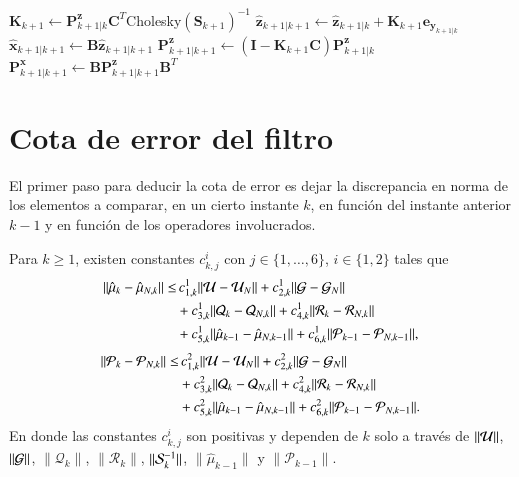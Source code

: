 \begin{algorithm}[h]
\begin{algorithmic}[1]
    \State $\mathbf{K}_{k+1} \gets \mathbf{P}^{\mathbf{z}}_{k+1|k} \mathbf{C}^T$Cholesky$(\mathbf{S}_{k+1})^{-1}$
    \State $\hat{\mathbf{z}}_{k+1|k+1} \gets \hat{\mathbf{z}}_{k+1|k} + \mathbf{K}_{k+1} \mathbf{e}_{\mathbf{y}_{k+1|k}}$
    \State $\hat{\mathbf{x}}_{k+1|k+1} \gets \mathbf{B}\hat{\mathbf{z}}_{k+1|k+1}$
    \State $\mathbf{P}^\mathbf{z}_{k+1|k+1} \gets (\mathbf{I} - \mathbf{K}_{k+1} 
    \mathbf{C}) \mathbf{P}^{\mathbf{z}}_{k+1|k}$
    \State $\mathbf{P}^\mathbf{x}_{k+1|k+1} \gets \mathbf{B}\mathbf{P}^\mathbf{z}_{k+1|k+1} \mathbf{B}^T$
\EndFor
\end{algorithmic}
\end{algorithm}

\section{Cota de error del filtro}

El primer paso para deducir la cota de error es dejar la discrepancia en norma de los elementos a comparar, en un cierto instante $k$, en función del instante anterior $k-1$ y en función de los operadores involucrados.

\begin{prop}
	Para $k \geq 1$, existen constantes $c_{k,j}^i$ con $j \in \{ 1, \dots, 6\}$, $i \in \{ 1, 2\}$ tales que
	\begin{equation*}
		\begin{aligned}
			\| \hat \mu_{k} - \hat \mu_{N,k}  \| \leq & \, c_{1,k}^1 \| \U - \U_N \| +  c_{2,k}^1 \| \G - \G_N \| \\ 
			&+ c_{3,k}^1 \| \mathcal{Q}_{k} - \mathcal{Q}_{N, k} \| +c_{4,k}^1 \| \mathcal{R}_{k} - \mathcal{R}_{N, k} \| \\
			& + c_{5,k}^1 \| \hat \mu_{k-1} - \hat \mu_{N, k-1} \| + c_{6,k}^1 \| \mathcal{P}_{k-1} - \mathcal{P}_{N, k-1} \|,
		\end{aligned}
	\end{equation*}
	\begin{equation*}
		\begin{aligned}
			\| \mathcal{P}_{k} - \mathcal{P}_{N,k} \| \leq & \, c_{1,k}^2 \| \U - \U_N \| +  c_{2,k}^2 \| \G - \G_N \| \\ 
			&+ c_{3,k}^2 \| \mathcal{Q}_{k} - \mathcal{Q}_{N, k} \| +c_{4,k}^2 \| \mathcal{R}_{k} - \mathcal{R}_{N, k} \| \\
			& + c_{5,k}^2 \| \hat \mu_{k-1} - \hat \mu_{N, k-1} \| + c_{6,k}^2 \| \mathcal{P}_{k-1} - \mathcal{P}_{N, k-1} \|.
		\end{aligned}
	\end{equation*}
	En donde las constantes $c_{k,j}^i$ son positivas y dependen de $k$ solo a través de $\| \U \| $, $\| \G \| $, $\| \mathcal{Q}_{k} \| $, $\| \mathcal{R}_{k} \| $, $\| \S_{k}^{-1} \| $, $\| \hat{\mu}_{k-1} \| $ y $\| \mathcal{P}_{k-1} \| $.
	\label{prop:err_kerKKF_1}
\end{prop}

